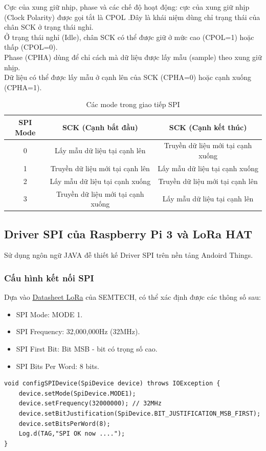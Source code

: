 \newpage
Cực của xung giữ nhịp, phase và các chế độ hoạt động: cực của xung giữ nhịp (Clock Polarity) được gọi tắt là CPOL .Đây là khái niệm dùng chỉ trạng thái của chân SCK ở trạng thái nghỉ.\\
Ở trạng thái nghỉ (Idle), chân SCK có thể được giữ ở mức cao (CPOL=1) hoặc thấp (CPOL=0).\\
Phase (CPHA) dùng để chỉ cách mà dữ liệu được lấy mẫu (sample) theo xung giữ nhịp.\\
Dữ liệu có thể được lấy mẫu ở cạnh lên của SCK (CPHA=0) hoặc cạnh xuống (CPHA=1).\\

\begin{table}[!h]
\begin{center}
\begin{tabular}{|c|c|c|}
\hline
\textbf{SPI Mode} & \textbf{SCK (Cạnh bắt đầu)} & \textbf{SCK (Cạnh kết thúc)} \\ 
\hline
0 & Lấy mẫu dữ liệu tại cạnh lên & Truyền dữ liệu mới tại cạnh xuống\\
\hline
1 & Truyền dữ liệu mới tại cạnh lên & Lấy mẫu dữ liệu tại cạnh xuống\\
\hline
2 & Lấy mẫu dữ liệu tại cạnh xuống & Truyền dữ liệu mới tại cạnh lên\\
\hline
3 & Truyền dữ liệu mới tại cạnh xuống & Lấy mẫu dữ liệu tại cạnh lên\\
\hline
\end{tabular}
\caption{Các mode trong giao tiếp SPI \cite{tl11}}
\end{center}
\end{table}

\subsection{Driver SPI của Raspberry Pi 3 và LoRa HAT}
Sử dụng ngôn ngữ JAVA đễ thiết kế Driver SPI trên nền tảng Andoird Things.
\subsubsection{Cấu hình kết nối SPI}
Dựa vào \href{https://www.mouser.com/ds/2/761/sx1276-944191.pdf}{Datasheet LoRa}  của SEMTECH, có thể xác định được các thông số sau:
\begin{itemize}
    \item SPI Mode: MODE 1.
    \item SPI Frequency: 32,000,000Hz (32MHz).
    \item SPI First Bit: Bit MSB - bit có trọng số cao.
    \item SPI Bits Per Word: 8 bits.
\end{itemize}
\begin{lstlisting}[label={list:first},caption=Cấu hình SPI cho việc giao tiếp]
void configSPIDevice(SpiDevice device) throws IOException {
    device.setMode(SpiDevice.MODE1);
    device.setFrequency(32000000); // 32MHz
    device.setBitJustification(SpiDevice.BIT_JUSTIFICATION_MSB_FIRST);
    device.setBitsPerWord(8);
    Log.d(TAG,"SPI OK now ....");
}
\end{lstlisting}
